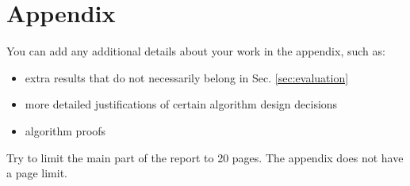 \documentclass[../report.tex]{subfiles}
\begin{document}
    \section*{Appendix}
    \label{sec:appendix}

    You can add any additional details about your work in the appendix, such as:
    \begin{itemize}
        \item extra results that do not necessarily belong in Sec. \ref{sec:evaluation}
        \item more detailed justifications of certain algorithm design decisions
        \item algorithm proofs
    \end{itemize}
    Try to limit the main part of the report to 20 pages. The appendix does not have a page limit.
\end{document}
